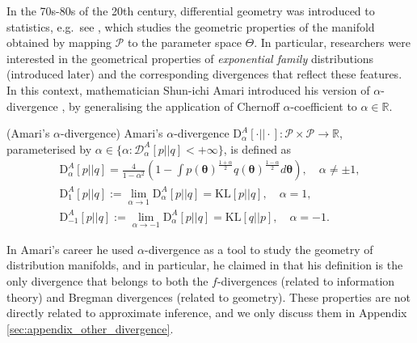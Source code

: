 In the 70s-80s of the 20th century, differential geometry was introduced to statistics, e.g.~see \cite{efron:curvature1975, efron:geometry_expfam1978, amari:ig1985}, which studies the geometric properties of the manifold obtained by mapping $\mathcal{P}$ to the parameter space $\Theta$. In particular, researchers were interested in the geometrical properties of \emph{exponential family} distributions (introduced later) and the corresponding divergences that reflect these features. In this context, mathematician Shun-ichi Amari introduced his version of $\alpha$-divergence \citep{amari:geometry1982, amari:ig1985}, by generalising the application of Chernoff $\alpha$-coefficient to $\alpha \in \mathbb{R}$.
\begin{definition}
(Amari's $\alpha$-divergence)
Amari's $\alpha$-divergence $\mathrm{D}_{\alpha}^{A}[\cdot || \cdot]: \mathcal{P} \times \mathcal{P} \rightarrow \mathbb{R}$, parameterised by $\alpha \in \{\alpha :  \mathcal{D}_{\alpha}^{A}[p||q] < +\infty \}$, is defined as
\begin{align}
\mathrm{D}_{\alpha}^{A}[p||q] = \frac{4}{ 1 - \alpha^2 } \left( 1 - \int p(\bm{\theta})^{\frac{1 + \alpha}{2}} q(\bm{\theta})^{\frac{1 - \alpha}{2}} d\bm{\theta}\right), \quad \alpha \neq \pm 1, \\
\mathrm{D}_{1}^{A}[p||q] := \lim_{\alpha \rightarrow 1} \mathrm{D}_{\alpha}^{A}[p||q] = \mathrm{KL}[p||q], \quad \alpha = 1, \\
\mathrm{D}_{-1}^{A}[p||q] := \lim_{\alpha \rightarrow -1} \mathrm{D}_{\alpha}^{A}[p||q] = \mathrm{KL}[q||p], \quad \alpha = -1.
\end{align}
\end{definition}

In Amari's career he used $\alpha$-divergence as a tool to study the geometry of distribution manifolds, and in particular, he claimed in \cite{amari:divergence2009} that his definition is the only divergence that belongs to both the $f$-divergences \citep{csiszar:divergence1963} (related to information theory) and Bregman divergences \citep{bregman:divergence1967} (related to geometry). These properties are not directly related to approximate inference, and we only discuss them in Appendix \ref{sec:appendix_other_divergence}.

